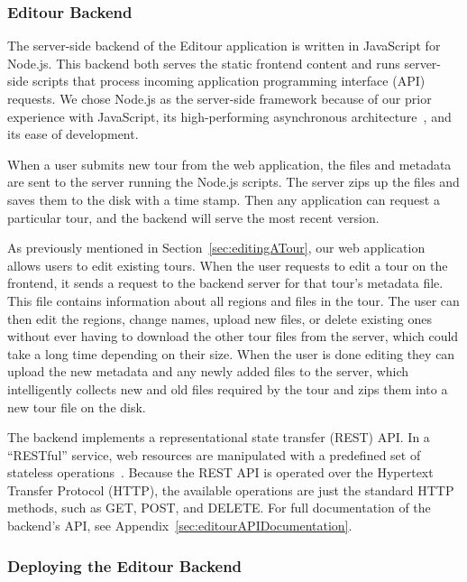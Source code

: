 \documentclass[a4paper, 10pt, american, titlepage]{article}
\begin{document}
\subsubsection{Editour Backend}
\label{sec:editourBackend}

The server-side backend of the Editour application is written in JavaScript for
Node.js. This backend both serves the static frontend content and runs
server-side scripts that process incoming application programming interface
(API) requests. We chose Node.js as the server-side framework because of our
prior experience with JavaScript, its high-performing asynchronous
architecture~\autocite{orsini2013}, and its ease of development.

When a user submits new tour from the web application, the files and metadata
are sent to the server running the Node.js scripts. The server zips up the files
and saves them to the disk with a time stamp. Then any application can request a
particular tour, and the backend will serve the most recent version.

As previously mentioned in Section~\ref{sec:editingATour}, our web application
allows users to edit existing tours. When the user requests to edit a tour on
the frontend, it sends a request to the backend server for that tour's metadata
file. This file contains information about all regions and files in the tour.
The user can then edit the regions, change names, upload new files, or delete
existing ones without ever having to download the other tour files from the
server, which could take a long time depending on their size. When the user is
done editing they can upload the new metadata and any newly added files to the
server, which intelligently collects new and old files required by the tour and
zips them into a new tour file on the disk.

The backend implements a representational state transfer (REST) API.
In a ``RESTful'' service, web resources are manipulated with a predefined set of
stateless operations~\autocite{rfc7231}. Because the REST API is operated over
the Hypertext Transfer Protocol (HTTP), the available operations are just the
standard HTTP methods, such as GET, POST, and DELETE. For full documentation of
the backend's API, see Appendix~\ref{sec:editourAPIDocumentation}.

\subsubsection{Deploying the Editour Backend}
\label{sec:deployingTheEditourBackend}
\end{document}
